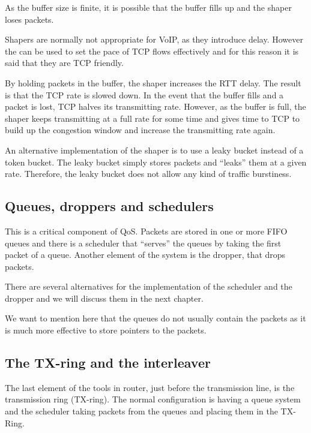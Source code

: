 As the buffer size is finite, it is possible that the buffer fills up and the shaper loses packets.

Shapers are normally not appropriate for VoIP, as they introduce delay.
However the can be used to set the pace of TCP flows effectively and for this reason it is said that they are TCP friendly.

By holding packets in the buffer, the shaper increases the RTT delay.
The result is that the TCP rate is slowed down.
In the event that the buffer fills and a packet is lost, TCP halves its transmitting rate.
However, as the buffer is full, the shaper keeps transmitting at a full rate for some time and gives time to TCP to build up the congestion window and increase the transmitting rate again.

An alternative implementation of the shaper is to use a leaky bucket instead of a token bucket.
The leaky bucket simply stores packets and ``leaks'' them at a given rate.
Therefore, the leaky bucket does not allow any kind of traffic burstiness.

\subsection{Queues, droppers and schedulers}

This is a critical component of QoS.
Packets are stored in one or more FIFO queues and there is a scheduler that ``serves'' the queues by taking the first packet of a queue.
Another element of the system is the dropper, that drops packets.

There are several alternatives for the implementation of the scheduler and the dropper and we will discuss them in the next chapter.

We want to mention here that the queues do not usually contain the packets as it is much more effective to store pointers to the packets.

\subsection{The TX-ring and the interleaver}
The last element of the tools in router, just before the transmission line, is the transmission ring (TX-ring).
The normal configuration is having a queue system and the scheduler taking packets from the queues and placing them in the TX-Ring.
